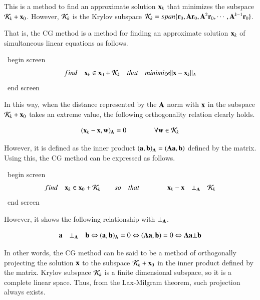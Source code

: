 This is a method to find an approximate solution $\mathbf{x}_k$ that minimizes the subspace ${\cal K}_k+\mathbf{x}_0$. However, ${\cal K}_k$ is the Krylov subspace $\mathbf{\cal K}_k=span\{\mathbf{r}_0,\mathbf{A}\mathbf{r}_0,\mathbf{A}^2\mathbf{r}_0,\cdots,\mathbf{A}^{k-1}\mathbf{r}_0\}$.

That is, the CG method is a method for finding an approximate solution $\mathbf{x}_k$ of simultaneous linear equations as follows.

\ begin {screen}
\begin{equation}
find \quad \mathbf{x}_k\in\mathbf{x}_0+\mathbf{\cal K}_k\quad that \quad minimize ||\mathbf{x}-\mathbf{x}_k||_A
\end{equation}
\ end {screen}

In this way, when the distance represented by the $\mathbf{A}$ norm with $\mathbf{x}$ in the subspace ${\cal K}_k+\mathbf{x}_0$ takes an extreme value, the following orthogonality relation clearly holds.

\begin{equation}
(\mathbf{x}_k-\mathbf{x},\mathbf{w})_{\mathbf{A}} = 0 \qquad \qquad \forall\mathbf{w}\in{\cal K}_k
\end{equation}


However, it is defined as the inner product $(\mathbf{a},\mathbf{b})_{\mathbf{A}}=(\mathbf{A}\mathbf{a},\mathbf{b})$ defined by the matrix. Using this, the CG method can be expressed as follows.

\ begin {screen}
\begin{equation}
find \quad \mathbf{x}_k\in\mathbf{x}_0+{\cal K}_k \qquad so \quad that \qquad \qquad \mathbf{x}_k-\mathbf{x}\quad\bot_{\mathbf{A}}\quad{\cal K}_k
\end{equation}
\ end {screen}

However, it shows the following relationship with $\bot_{\mathbf{A}}$.

\begin{equation}
\mathbf{a}\quad\bot_{\mathbf{A}}\quad\mathbf{b} \Leftrightarrow (\mathbf{a},\mathbf{b})_{\mathbf{A}}=0 \Leftrightarrow (\mathbf{A}\mathbf{a},\mathbf{b})=0\Leftrightarrow \mathbf{A}\mathbf{a} \bot \mathbf{b}
\end{equation}


In other words, the CG method can be said to be a method of orthogonally projecting the solution $\mathbf{x}$ to the subspace ${\cal K}_k+\mathbf{x}_0$ in the inner product defined by the matrix. Krylov subspace ${\cal K}_k$ is a finite dimensional subspace, so it is a complete linear space. Thus, from the Lax-Milgram theorem, such projection always exists.

